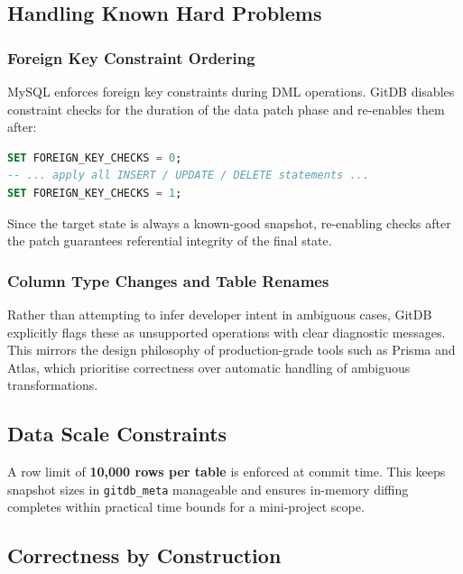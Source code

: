 \documentclass[12pt, a4paper]{article}
\begin{document}
\subsection{Handling Known Hard Problems}

\subsubsection{Foreign Key Constraint Ordering}
MySQL enforces foreign key constraints during DML operations. GitDB disables
constraint checks for the duration of the data patch phase and re-enables them
after:

\begin{tcolorbox}[commandbox, title=Foreign Key Handling (MySQL)]
\begin{lstlisting}[language=SQL]
SET FOREIGN_KEY_CHECKS = 0;
-- ... apply all INSERT / UPDATE / DELETE statements ...
SET FOREIGN_KEY_CHECKS = 1;
\end{lstlisting}
\end{tcolorbox}

Since the target state is always a known-good snapshot, re-enabling checks after
the patch guarantees referential integrity of the final state.

\subsubsection{Column Type Changes and Table Renames}
Rather than attempting to infer developer intent in ambiguous cases, GitDB
explicitly flags these as unsupported operations with clear diagnostic messages.
This mirrors the design philosophy of production-grade tools such as Prisma and
Atlas, which prioritise correctness over automatic handling of ambiguous
transformations.

\subsection{Data Scale Constraints}

A row limit of \textbf{10,000 rows per table} is enforced at commit time. This
keeps snapshot sizes in \texttt{gitdb\_meta} manageable and ensures in-memory
diffing completes within practical time bounds for a mini-project scope.

\subsection{Correctness by Construction}
\end{document}
